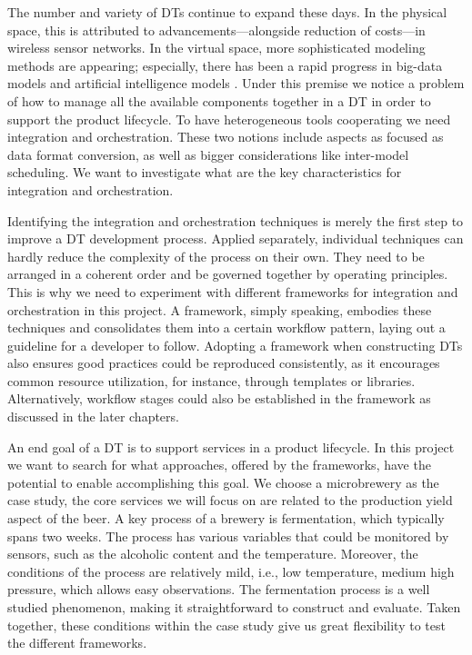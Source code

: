 The number and variety of DTs continue to expand these days. In the physical space, this is attributed to advancements---alongside reduction of costs---in wireless sensor networks. In the virtual space, more sophisticated modeling methods are appearing; especially, there has been a rapid progress in big-data models and artificial intelligence models \cite{Duan2019}. Under this premise we notice a problem of how to manage all the available components together in a DT in order to support the product lifecycle. To have heterogeneous tools cooperating we need integration and orchestration. These two notions include aspects as focused as data format conversion, as well as bigger considerations like inter-model scheduling. We want to investigate what are the key characteristics for integration and orchestration. 

Identifying the integration and orchestration techniques is merely the first step to improve a DT development process. Applied separately, individual techniques can hardly reduce the complexity of the process on their own. They need to be arranged in a coherent order and be governed together by operating principles. This is why we need to experiment with different frameworks for integration and orchestration in this project. A framework, simply speaking, embodies these techniques and consolidates them into a certain workflow pattern, laying out a guideline for a developer to follow. Adopting a framework when constructing DTs also ensures good practices could be reproduced consistently, as it encourages common resource utilization, for instance, through templates or libraries. Alternatively, workflow stages could also be established in the framework as discussed in the later chapters. 

An end goal of a DT is to support services in a product lifecycle. In this project we want to search for what approaches, offered by the frameworks, have the potential to enable accomplishing this goal. We choose a microbrewery as the case study, the core services we will focus on are related to the production yield aspect of the beer. A key process of a brewery is fermentation, which typically spans two weeks. The process has various variables that could be monitored by sensors, such as the alcoholic content and the temperature. Moreover, the conditions of the process are relatively mild, i.e., low temperature, medium high pressure, which allows easy observations. The fermentation process is a well studied phenomenon, making it straightforward to construct and evaluate. Taken together, these conditions within the case study give us great flexibility to test the different frameworks. 

